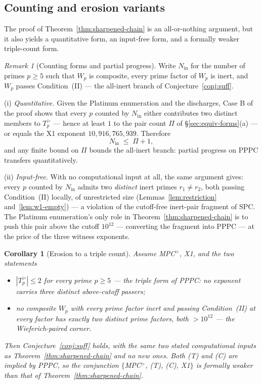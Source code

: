 \documentclass[11pt]{amsart}
\theoremstyle{plain}
\newtheorem{corollary}[theorem]{Corollary}
\theoremstyle{definition}
\theoremstyle{remark}
\newtheorem{remark}[theorem]{Remark}
\numberwithin{equation}{section}
\begin{document}
\subsection{Counting and erosion variants}\label{sec:variants}

The proof of Theorem~\ref{thm:sharpened-chain} is an all-or-nothing
argument, but it also yields a quantitative form, an input-free form,
and a formally weaker triple-count form.

\begin{remark}[Counting forms and partial progress]\label{rem:counting-form}
Write $N_{\mathrm{in}}$ for the number of primes $p \geq 5$ such that $W_p$ is
composite, every prime factor of $W_p$ is inert, and $W_p$ passes
Condition~(II) --- the all-inert branch of Conjecture~\ref{conj:suff}.

(i) \emph{Quantitative.} Given the Platinum enumeration and the
discharges, Case B of the proof shows that every $p$ counted by $N_{\mathrm{in}}$
either contributes two distinct members to $T_p^{>}$ --- hence at least
$1$ to the pair count $\Pi$ of \S\ref{sec:equiv-forms}(a) --- or equals
the X1 exponent $10{,}916{,}765{,}939$. Therefore
\[
  N_{\mathrm{in}} \;\leq\; \Pi + 1,
\]
and any finite bound on $\Pi$ bounds the all-inert branch: partial
progress on PPPC transfers quantitatively.

(ii) \emph{Input-free.} With no computational input at all, the same
argument gives: every $p$ counted by $N_{\mathrm{in}}$ admits two \emph{distinct}
inert primes $r_1 \neq r_2$, both passing Condition~(II) locally, of
unrestricted size (Lemmas~\ref{lem:restriction} and~\ref{lem:w1-empty})
--- a violation of the cutoff-free inert-pair fragment of SPC. The
Platinum enumeration's only role in Theorem~\ref{thm:sharpened-chain}
is to push this pair above the cutoff $10^{12}$ --- converting the
fragment into PPPC --- at the price of the three witness exponents.
\end{remark}

\begin{corollary}[Erosion to a triple count]\label{cor:triple-erosion}
Assume MPC$^{>}$, X1, and the two statements
\begin{itemize}
\item[(T)] $|T_p^{>}| \leq 2$ for every prime $p \geq 5$ --- the triple
form of PPPC: no exponent carries three distinct above-cutoff passers;
\item[(C)] no composite $W_p$ with every prime factor inert and passing
Condition~(II) at every factor has exactly two distinct prime factors,
both $> 10^{12}$ --- the \emph{Wieferich-paired corner}.
\end{itemize}
Then Conjecture~\ref{conj:suff} holds, with the same two stated
computational inputs as Theorem~\ref{thm:sharpened-chain} and no new
ones. Both (T) and (C) are implied by PPPC, so the conjunction
$\{$MPC$^{>}$, (T), (C), X1$\}$ is formally weaker than that of
Theorem~\ref{thm:sharpened-chain}.
\end{corollary}
\end{document}

